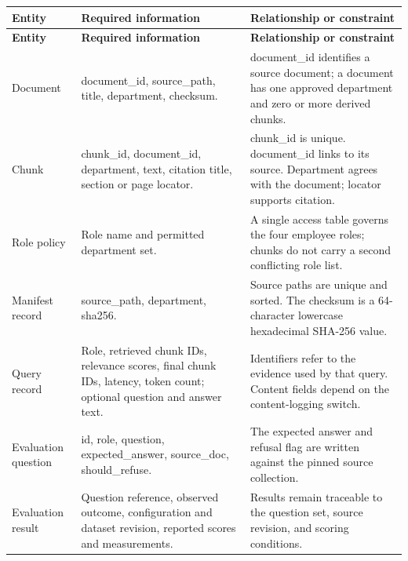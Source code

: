 \documentclass[11pt,letterpaper]{article}
\begin{document}
\begin{longtable}{|P{\arrayrulewidth\relax}|P{\arrayrulewidth\relax}|P{\arrayrulewidth\relax}|}

\hline{}

\textbf{Entity} & \textbf{Required information} & \textbf{Relationship or constraint} \\ \hline

\endfirsthead

\hline{}

\textbf{Entity} & \textbf{Required information} & \textbf{Relationship or constraint} \\ \hline

\endhead

\hline\endfoot

\hline\endlastfoot

Document & document\_id, source\_path, title, department, checksum. & document\_id identifies a source document; a document has one approved department and zero or more derived chunks. \\ \hline

Chunk & chunk\_id, document\_id, department, text, citation title, section or page locator. & chunk\_id is unique. document\_id links to its source. Department agrees with the document; locator supports citation. \\ \hline

Role policy & Role name and permitted department set. & A single access table governs the four employee roles; chunks do not carry a second conflicting role list. \\ \hline

Manifest record & source\_path, department, sha256. & Source paths are unique and sorted. The checksum is a 64-character lowercase hexadecimal SHA-256 value. \\ \hline

Query record & Role, retrieved chunk IDs, relevance scores, final chunk IDs, latency, token count; optional question and answer text. & Identifiers refer to the evidence used by that query. Content fields depend on the content-logging switch. \\ \hline

Evaluation question & id, role, question, expected\_answer, source\_doc, should\_refuse. & The expected answer and refusal flag are written against the pinned source collection. \\ \hline

Evaluation result & Question reference, observed outcome, configuration and dataset revision, reported scores and measurements. & Results remain traceable to the question set, source revision, and scoring conditions. \\ \hline

\end{longtable}
\end{document}
